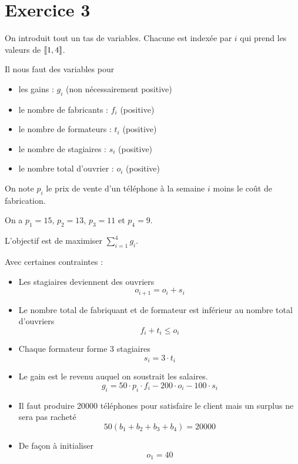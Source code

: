 \section*{Exercice 3}

On introduit tout un tas de variables. Chacune est indexée par $i$ qui prend les valeurs de $\left\llbracket 1, 4 \right\rrbracket$.

Il nous faut des variables pour
\begin{itemize}
    \item les gains : $g_i$ (non nécessairement positive)
    \item le nombre de fabricants : $f_i$ (positive)
    \item le nombre de formateurs : $t_i$ (positive)
    \item le nombre de stagiaires : $s_i$ (positive)
    \item le nombre total d'ouvrier : $o_i$ (positive)
\end{itemize}

On note $p_i$ le prix de vente d'un téléphone à la semaine $i$ moins le coût de fabrication.

On a $p_1 = 15$, $p_2 = 13$, $p_3 = 11$ et $p_4 = 9$.

L'objectif est de maximiser $\sum\limits_{i=1}^4 g_i$.

Avec certaines contraintes :
\begin{itemize}
    \item Les stagiaires deviennent des ouvriers
        \[
            o_{i+1} =  o_i + s_i
        \]
    \item Le nombre total de fabriquant et de formateur est inférieur au nombre total d'ouvriers
        \[
            f_i+t_i \leqslant o_i
        \]
    \item Chaque formateur forme 3 stagiaires
        \[
            s_i=3\cdot t_i        
        \]
    \item Le gain est le revenu auquel on soustrait les salaires.
        \[
            g_i = 50\cdot p_i \cdot f_i-200\cdot o_i-100\cdot s_i
        \]
    \item Il faut produire 20000 téléphones pour satisfaire le client mais un surplus ne sera pas racheté
        \[
            50(b_1+b_2+b_3+b_4) = 20000
        \]
    \item De façon à initialiser
        \[
            o_1 = 40
        \]
\end{itemize}




